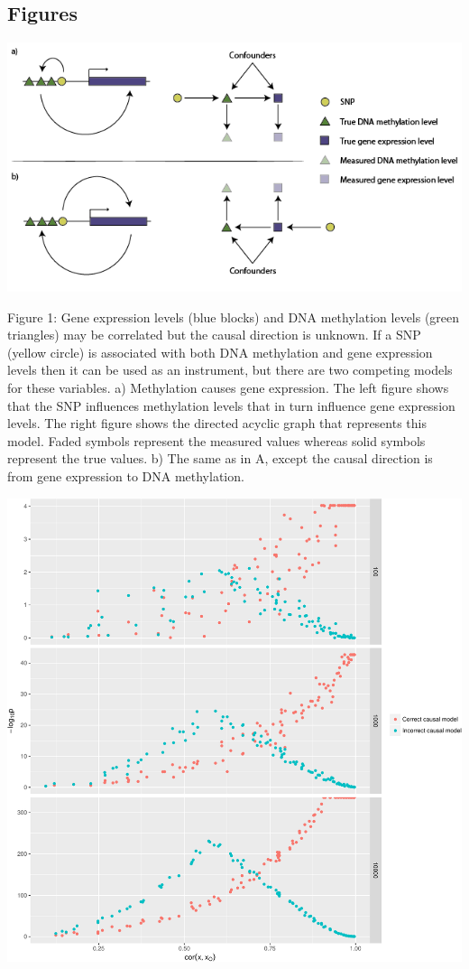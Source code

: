 \documentclass[]{article}
\begin{document}
\newpage

\subsection{Figures}\label{figures}

\includegraphics{../images/dag-01.png}

Figure 1: Gene expression levels (blue blocks) and DNA methylation
levels (green triangles) may be correlated but the causal direction is
unknown. If a SNP (yellow circle) is associated with both DNA
methylation and gene expression levels then it can be used as an
instrument, but there are two competing models for these variables. a)
Methylation causes gene expression. The left figure shows that the SNP
influences methylation levels that in turn influence gene expression
levels. The right figure shows the directed acyclic graph that
represents this model. Faded symbols represent the measured values
whereas solid symbols represent the true values. b) The same as in A,
except the causal direction is from gene expression to DNA methylation.

\newpage

\includegraphics{manuscript_files/figure-latex/cit_measurement_error_figure-1.pdf}
\end{document}

